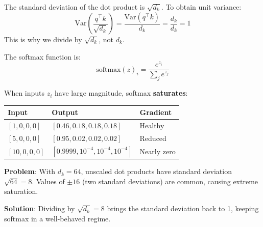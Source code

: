 \begin{corollary}
    The standard deviation of the dot product is $\sqrt{d_k}$. To obtain unit variance:
    \[
        \text{Var}\left(\frac{q^\top k}{\sqrt{d_k}}\right) = \frac{\text{Var}(q^\top k)}{d_k} = \frac{d_k}{d_k} = 1
    \]
    This is why we divide by $\sqrt{d_k}$, not $d_k$.
\end{corollary}

\begin{remark}
    The softmax function is:
    \[
        \text{softmax}(z)_i = \frac{e^{z_i}}{\sum_j e^{z_j}}
    \]

    When inputs $z_i$ have large magnitude, softmax \textbf{saturates}:

    \begin{center}
        \begin{tabular}{l|l|l}
            \textbf{Input} & \textbf{Output} & \textbf{Gradient} \\
            \hline
            $[1, 0, 0, 0]$ & $[0.46, 0.18, 0.18, 0.18]$ & Healthy \\
            $[5, 0, 0, 0]$ & $[0.95, 0.02, 0.02, 0.02]$ & Reduced \\
            $[10, 0, 0, 0]$ & $[0.9999, 10^{-4}, 10^{-4}, 10^{-4}]$ & Nearly zero \\
        \end{tabular}
    \end{center}

    \textbf{Problem}: With $d_k = 64$, unscaled dot products have standard deviation $\sqrt{64} = 8$. Values of $\pm 16$ (two standard deviations) are common, causing extreme saturation.

    \textbf{Solution}: Dividing by $\sqrt{d_k} = 8$ brings the standard deviation back to 1, keeping softmax in a well-behaved regime.
\end{remark}

